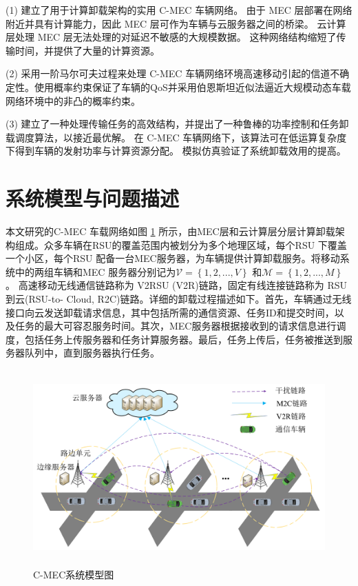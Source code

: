(1) 建立了用于计算卸载架构的实用 C-MEC 车辆网络。 由于 MEC 层部署在网络附近并具有计算能力，因此 MEC 层可作为车辆与云服务器之间的桥梁。 云计算层处理 MEC 层无法处理的对延迟不敏感的大规模数据。 这种网络结构缩短了传输时间，并提供了大量的计算资源。

(2) 采用一阶马尔可夫过程来处理 C-MEC 车辆网络环境高速移动引起的信道不确定性。使用概率约束保证了车辆的QoS并采用伯恩斯坦近似法逼近大规模动态车载网络环境中的非凸的概率约束。

(3) 建立了一种处理传输任务的高效结构，并提出了一种鲁棒的功率控制和任务卸载调度算法，以接近最优解。 在 C-MEC 车辆网络下，该算法可在低运算复杂度下得到车辆的发射功率与计算资源分配。 模拟仿真验证了系统卸载效用的提高。
\section{系统模型与问题描述}\label{section3-2}
本文研究的C-MEC 车载网络如图 \ref{F3-1} 所示，由MEC层和云计算层分层计算卸载架构组成。众多车辆在RSU的覆盖范围内被划分为多个地理区域，每个RSU 下覆盖一个小区，每个RSU 配备一台MEC服务器，为车辆提供计算卸载服务。将移动系统中的两组车辆和MEC 服务器分别记为$\mathcal{V}=\left\{1,2,..., V\right\}$ 和$\mathcal{M}=\left\{1,2,..., M\right\}$。 高速移动无线通信链路称为 V2RSU (V2R)链路，固定有线连接链路称为 RSU 到云(RSU-to-
Cloud, R2C)链路。详细的卸载过程描述如下。首先，车辆通过无线接口向云发送卸载请求信息，其中包括所需的通信资源、任务ID和提交时间，以及任务的最大可容忍服务时间。其次，MEC服务器根据接收到的请求信息进行调度，包括任务上传服务器和任务计算服务器。最后，任务上传后，任务被推送到服务器队列中，直到服务器执行任务。
\begin{figure}[H]
\centering
\includegraphics[width=14cm,height=7.5cm]{figures//chap3//文章一在用model2.pdf}
\caption{C-MEC系统模型图}
\label{F3-1}
\end{figure}

